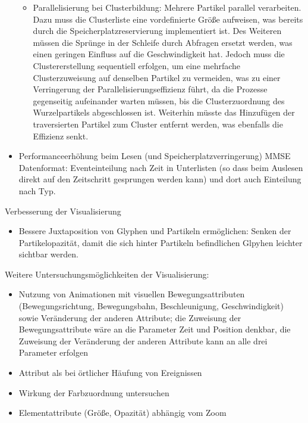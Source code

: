 \begin{itemize}
\begin{itemize}
		\item Parallelisierung bei Clusterbildung: Mehrere Partikel parallel verarbeiten. Dazu muss die Clusterliste eine vordefinierte Größe aufweisen, was bereits durch die Speicherplatzreservierung implementiert ist. Des Weiteren müssen die Sprünge in der Schleife durch Abfragen ersetzt werden, was einen geringen Einfluss auf die Geschwindigkeit hat. Jedoch muss die Clustererstellung sequentiell erfolgen, um eine mehrfache Clusterzuweisung auf denselben Partikel zu vermeiden, was zu einer Verringerung der Parallelisierungseffizienz führt, da die Prozesse gegenseitig aufeinander warten müssen, bis die Clusterzuordnung des Wurzelpartikels abgeschlossen ist. Weiterhin müsste das Hinzufügen der traversierten Partikel zum Cluster entfernt werden, was ebenfalls die Effizienz senkt.
	\end{itemize}
	\item Performanceerhöhung beim Lesen (und Speicherplatzverringerung) MMSE Datenformat: Eventeinteilung nach Zeit in Unterlisten (so dass beim Auslesen direkt auf den Zeitschritt gesprungen werden kann) und dort auch Einteilung nach Typ.
\end{itemize}

Verbesserung der Visualisierung
\begin{itemize}
	\item Bessere Juxtaposition von Glyphen und Partikeln ermöglichen: Senken der Partikelopazität, damit die sich hinter Partikeln befindlichen Glpyhen leichter sichtbar werden.
\end{itemize}

Weitere Untersuchungsmöglichkeiten der Visualisierung:
\begin{itemize}
	\item Nutzung von Animationen mit visuellen Bewegungsattributen (Bewegungsrichtung, Bewegungsbahn, Beschleunigung, Geschwindigkeit) sowie Veränderung der anderen Attribute; die Zuweisung der Bewegungsattribute wäre an die Parameter Zeit und Position denkbar, die Zuweisung der Veränderung der anderen Attribute kann an alle drei Parameter erfolgen
	\item Attribut  als  bei örtlicher Häufung von Ereignissen
	\item Wirkung der Farbzuordnung untersuchen
	\item Elementattribute (Größe, Opazität) abhängig vom Zoom
\end{itemize}

